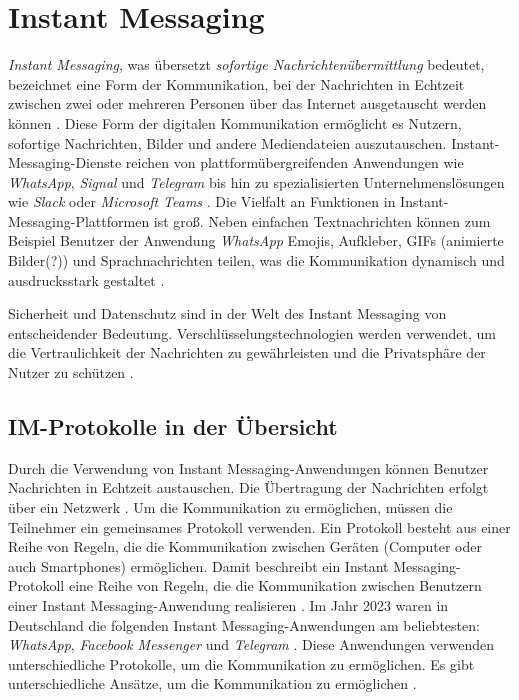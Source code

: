 \section{Instant Messaging}


\textit{Instant Messaging}, was übersetzt \textit{sofortige Nachrichtenübermittlung} bedeutet, bezeichnet eine Form der Kommunikation, bei der Nachrichten in Echtzeit zwischen zwei oder mehreren Personen über das Internet ausgetauscht werden können \Parencite[S. 69]{nist_mobileDeviceForensics}. Diese Form der digitalen Kommunikation ermöglicht es Nutzern, sofortige Nachrichten, Bilder und andere Mediendateien auszutauschen. Instant-Messaging-Dienste reichen von plattformübergreifenden Anwendungen wie \textit{WhatsApp}, \textit{Signal} und \textit{Telegram} bis hin zu spezialisierten Unternehmenslösungen wie \textit{Slack} oder \textit{Microsoft Teams} \parencite{Plett_IMDefinition}. Die Vielfalt an Funktionen in Instant-Messaging-Plattformen ist groß. Neben einfachen Textnachrichten können zum Beispiel Benutzer der Anwendung \textit{WhatsApp} Emojis, Aufkleber, GIFs (animierte Bilder(?)) und Sprachnachrichten teilen, was die Kommunikation dynamisch und ausdrucksstark gestaltet \Parencite{whatsapp_funktionen}.

Sicherheit und Datenschutz sind in der Welt des Instant Messaging von entscheidender Bedeutung. Verschlüsselungstechnologien werden verwendet, um die Vertraulichkeit der Nachrichten zu gewährleisten und die Privatsphäre der Nutzer zu schützen \parencite[S. 13706]{Wang_IMSecurity}.


\subsection{IM-Protokolle in der Übersicht}

Durch die Verwendung von Instant Messaging-Anwendungen können Benutzer Nachrichten in Echtzeit austauschen. Die Übertragung der Nachrichten erfolgt über ein Netzwerk \Parencite[S. 69]{nist_mobileDeviceForensics}. Um die Kommunikation zu ermöglichen, müssen die Teilnehmer ein gemeinsames Protokoll verwenden. Ein Protokoll besteht aus einer Reihe von Regeln, die die Kommunikation zwischen Geräten (Computer oder auch Smartphones) ermöglichen. Damit beschreibt ein Instant Messaging-Protokoll eine Reihe von Regeln, die die Kommunikation zwischen Benutzern einer Instant Messaging-Anwendung realisieren \Parencite{Novalnet_Protokoll}. Im Jahr 2023 waren in Deutschland die folgenden Instant Messaging-Anwendungen am beliebtesten: \textit{WhatsApp}, \textit{Facebook Messenger} und \textit{Telegram} \parencite{Statista_MessengerNutzung}. Diese Anwendungen verwenden unterschiedliche Protokolle, um die Kommunikation zu ermöglichen. Es gibt unterschiedliche Ansätze, um die Kommunikation zu ermöglichen \parencite[S. 103]{Luntovskyy_ModRechnernetze}. 



